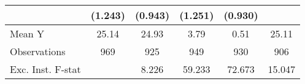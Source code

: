 {\begin{tabular}{l*{5}{c}}
            &     (1.243)         &     (0.943)         &     (1.251)         &     (0.930)         &                     \\
\midrule
Mean Y      &       25.14         &       24.93         &        3.79         &        0.51         &       25.11         \\
Observations&         969         &         925         &         949         &         930         &         906         \\
Exc. Inst. F-stat&                     &       8.226         &      59.233         &      72.673         &      15.047         \\
\bottomrule
\end{tabular}
}
